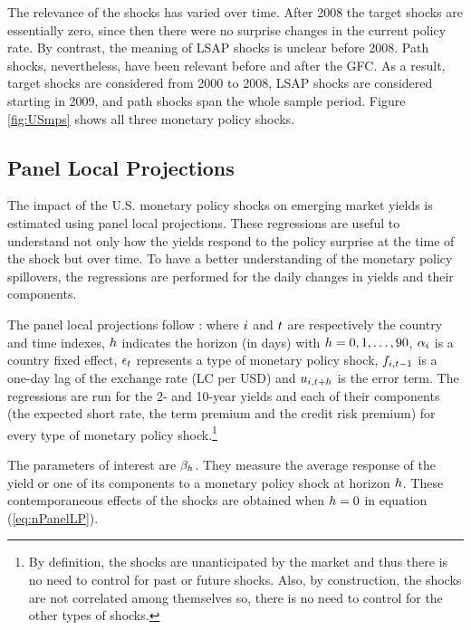 {%
The relevance of the shocks has varied over time.
After 2008 the target shocks are essentially zero, since then there were no surprise changes in the current policy rate.
By contrast, the meaning of LSAP shocks is unclear before 2008.
Path shocks, nevertheless, have been relevant before and after the GFC.
As a result, target shocks are considered from 2000 to 2008, LSAP shocks are considered starting in 2009, and path shocks span the whole sample period.
Figure \ref{fig:USmps} shows all three monetary policy shocks.


\subsection{Panel Local Projections} \label{sec:LPs}
\iftoggle{toclinks}{\gototoc}{} %

The impact of the U.S. monetary policy shocks on emerging market yields is estimated using panel local projections.
These regressions are useful to understand not only how the yields respond to the policy surprise at the time of the shock but over time.
To have a better understanding of the monetary policy spillovers, the regressions are performed for the daily changes in yields and their components.

The panel local projections follow \cite{Jorda:2005}:
\noindent where \(i\) and \(t\) are respectively the country and time indexes, \(h\) indicates the horizon (in days) with \(h = 0, 1, \ldots, 90\),  \(\alpha_{i}\) is a country fixed effect, \(\epsilon_{t}\) represents a type of monetary policy shock, \(f_{i,{t-1}}\) is a one-day lag of the exchange rate (LC per USD) and \(u_{i,{t+h}}\) is the error term.
The regressions are run for the 2- and 10-year yields and each of their components (the expected short rate, the term premium and the credit risk premium) for every type of monetary policy shock.\footnote{ By definition, the shocks are unanticipated by the market and thus there is no need to control for past or future shocks. Also, by construction, the shocks are not correlated among themselves so, there is no need to control for the other types of shocks.}

The parameters of interest are \(\beta_{h}\). They measure the average response of the yield or one of its components to a monetary policy shock at horizon \(h\).
These contemporaneous effects of the shocks are obtained when \(h = 0\) in equation (\ref{eq:nPanelLP}).

}
